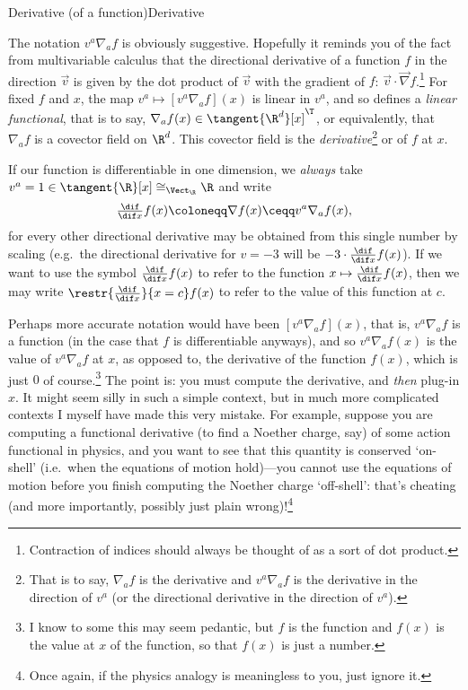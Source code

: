 \begin{prp}{Derivative (of a function)}{Derivative}
\begin{rmk}
The notation $v^a\nabla _af$ is obviously suggestive.  Hopefully it reminds you of the fact from multivariable calculus that the directional derivative of a function $f$ in the direction $\vec{v}$ is given by the dot product of $\vec{v}$ with the gradient of $f$:  $\vec{v}\cdot \vec{\nabla}f$.\footnote{Contraction of indices should always be thought of as a sort of dot product.}  For fixed $f$ and $x$, the map $v^a\mapsto [v^a\nabla _af](x)$ is linear in $v^a$, and so defines a \emph{linear functional}, that is to say, $\nabla _af(x)\in \tangent{\R ^d}[x]^{\T}$, or equivalently, that $\nabla _af$ is a covector field on $\R ^d$.  This covector field is the \emph{derivative}\footnote{That is to say, $\nabla _af$ is the derivative and $v^a\nabla _af$ is the derivative in the direction of $v^a$ (or the directional derivative in the direction of $v^a$).} or  of $f$ at $x$.
\end{rmk}
\begin{rmk}
If our function is differentiable in one dimension, we \emph{always} take $v^a=1\in \tangent{\R}[x]\cong _{\Vect _{\R}}\R$ and write
\begin{equation}
\tfrac{\dif}{\dif x}f(x)\coloneqq \nabla f(x)\ceqq v^a\nabla _af(x),
\end{equation}
for every other directional derivative may be obtained from this single number by scaling (e.g.~the directional derivative for $v=-3$ will be $-3\cdot \frac{\dif}{\dif x}f(x)$).  If we want to use the symbol $\frac{\dif}{\dif x}f(x)$ to refer to the function $x\mapsto \frac{\dif}{\dif x}f(x)$, then we may write $\restr{\frac{\dif}{\dif x}}{x=c}f(x)$ to refer to the value of this function at $c$.
\end{rmk}
\begin{rmk}
Perhaps more accurate notation would have been $[v^a\nabla _af](x)$, that is, $v^a\nabla _af$ is a function (in the case that $f$ is differentiable anyways), and so $v^a\nabla _af(x)$ is the value of $v^a\nabla _af$ at $x$, as opposed to, the derivative of the function $f(x)$, which is just $0$ of course.\footnote{I know to some this may seem pedantic, but $f$ is the function and $f(x)$ is the value at $x$ of the function, so that $f(x)$ is just a number.}  The point is:  you must compute the derivative, and \emph{then} plug-in $x$.  It might seem silly in such a simple context, but in much more complicated contexts I myself have made this very mistake.  For example, suppose you are computing a functional derivative (to find a Noether charge, say) of some action functional in physics, and you want to see that this quantity is conserved `on-shell' (i.e.~when the equations of motion hold)---you cannot use the equations of motion before you finish computing the Noether charge `off-shell':  that's cheating (and more importantly, possibly just plain wrong)!\footnote{Once again, if the physics analogy is meaningless to you, just ignore it.}

\end{rmk}
\end{prp}
